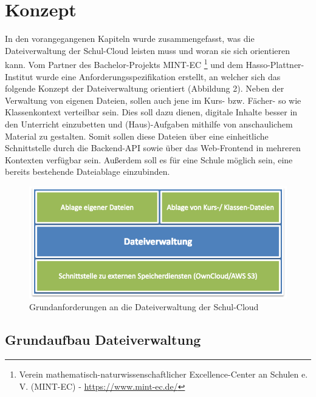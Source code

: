 \section{Konzept}
\label{sec:concept}

In den vorangegangenen Kapiteln wurde zusammengefasst, was die Dateiverwaltung der Schul-Cloud leisten muss und woran sie sich orientieren kann. Vom Partner des Bachelor-Projekts MINT-EC \footnote{Verein mathematisch-naturwissenschaftlicher Excellence-Center an Schulen e. V. (MINT-EC) - \url{https://www.mint-ec.de/}}  und dem Hasso-Plattner-Institut wurde eine Anforderungsspezifikation erstellt, an welcher sich das folgende Konzept der Dateiverwaltung orientiert (Abbildung 2). Neben der Verwaltung von eigenen Dateien, sollen auch  jene im Kurs- bzw. Fächer- so wie Klassenkontext verteilbar sein. Dies soll dazu dienen, digitale Inhalte besser in den Unterricht einzubetten und (Haus)-Aufgaben mithilfe von anschaulichem Material zu gestalten. Somit sollen diese Dateien über eine einheitliche Schnittstelle durch die Backend-API sowie über das Web-Frontend in mehreren Kontexten verfügbar sein. Außerdem soll es für eine Schule möglich sein, eine bereits bestehende Dateiablage einzubinden. 

\begin{figure}[H]
	\centering
	\includegraphics[width=0.8\linewidth]{images/AnforderungenDateiverwaltung}
	\caption[Caption for concept]{Grundanforderungen an die Dateiverwaltung der Schul-Cloud\footnotemark}
\end{figure}


\subsection{Grundaufbau Dateiverwaltung}

